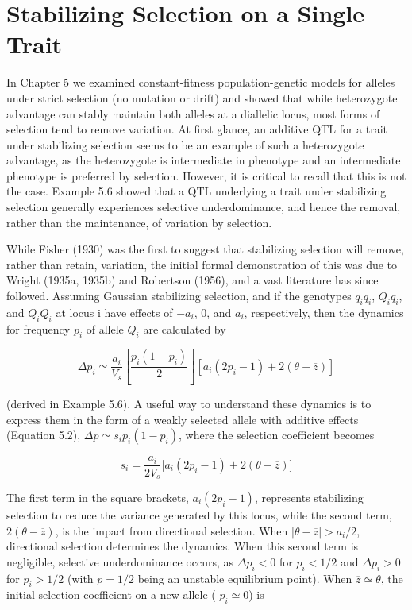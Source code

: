 \documentclass{article}
\begin{document}
\section{Stabilizing Selection on a Single Trait}
In Chapter 5 we examined constant-fitness population-genetic models for alleles under strict selection (no mutation or drift) and showed that while heterozygote advantage can stably maintain both alleles at a diallelic locus, most forms of selection tend to remove variation. At first glance, an additive QTL for a trait under stabilizing selection seems to be an example of such a heterozygote advantage, as the heterozygote is intermediate in phenotype and an intermediate phenotype is preferred by selection. However, it is critical to recall that this is not the case. Example 5.6 showed that a QTL underlying a trait under stabilizing selection generally experiences selective underdominance, and hence the removal, rather than the maintenance, of variation by selection.

While Fisher (1930) was the first to suggest that stabilizing selection will remove, rather than retain, variation, the initial formal demonstration of this was due to Wright (1935a, 1935b) and Robertson (1956), and a vast literature has since followed. Assuming Gaussian stabilizing selection, and if the genotypes  $ q_i q_i $,  $ Q_i q_i $, and  $ Q_i Q_i $ at locus i have effects of  $ -a_i $, 0, and  $ a_i $, respectively, then the dynamics for frequency  $ p_i $ of allele  $ Q_i $ are calculated by

\begin{equation}
\Delta p_{i}\simeq\frac{a_{i}}{V_{s}}\left[\frac{p_{i}(1-p_{i})}{2}\right]\left[a_{i}(2p_{i}-1)+2(\theta-\overline{z})\right]
\tag{28.4a}
\label{eq:28_4a}
\end{equation}

(derived in Example 5.6). A useful way to understand these dynamics is to express them in the form of a weakly selected allele with additive effects (Equation 5.2),  $ \Delta p \simeq s_i p_i(1 - p_i) $, where the selection coefficient becomes

\begin{equation}
s_{i}=\frac{a_{i}}{2V_{s}}\bigg[a_{i}(2p_{i}-1)+2(\theta-\overline{z})\bigg]
\tag{28.4b}
\label{eq:28_4b}
\end{equation}

The first term in the square brackets,  $ a_i(2p_i - 1) $, represents stabilizing selection to reduce the variance generated by this locus, while the second term,  $ 2(\theta - \overline{z}) $, is the impact from directional selection. When  $ |\theta - \overline{z}| > a_i/2 $, directional selection determines the dynamics. When this second term is negligible, selective underdominance occurs, as  $ \Delta p_i < 0 $ for  $ p_i < 1/2 $ and  $ \Delta p_i > 0 $ for  $ p_i > 1/2 $ (with  $ p = 1/2 $ being an unstable equilibrium point). When  $ \overline{z} \simeq \theta $, the initial selection coefficient on a new allele ( $ p_i \simeq 0 $) is
\end{document}
